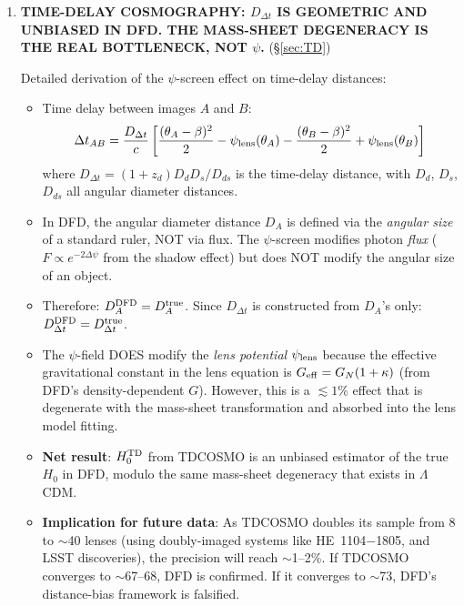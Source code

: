 \documentclass[11pt,a4paper]{article}
\newcommand{\LCDM}{$\Lambda$CDM}
\newcommand{\Dpsi}{\Delta\psi}
\begin{document}
\begin{tcolorbox}[colback=yellow!5!white, colframe=red!70!black,
  title=\textbf{W4i17 TOP 5 FINDINGS --- RANKED BY IMPACT}]
\begin{enumerate}
\item \textbf{TIME-DELAY COSMOGRAPHY: $D_{\Delta t}$ IS GEOMETRIC
  AND UNBIASED IN DFD. THE MASS-SHEET DEGENERACY IS THE REAL
  BOTTLENECK, NOT $\psi$.}
  (\S\ref{sec:TD})

  Detailed derivation of the $\psi$-screen effect on time-delay
  distances:
  \begin{itemize}[nosep]
  \item Time delay between images $A$ and $B$:
    \begin{equation}
    \Delta t_{AB} = \frac{D_{\Delta t}}{c}
    \left[\frac{(\theta_A - \beta)^2}{2} - \psi_{\rm lens}(\theta_A)
    - \frac{(\theta_B - \beta)^2}{2} + \psi_{\rm lens}(\theta_B)\right]
    \end{equation}
    where $D_{\Delta t} = (1+z_d) D_d D_s / D_{ds}$ is the
    time-delay distance, with $D_d$, $D_s$, $D_{ds}$ all
    angular diameter distances.
  \item In DFD, the angular diameter distance $D_A$ is defined
    via the \emph{angular size} of a standard ruler, NOT via
    flux. The $\psi$-screen modifies photon \emph{flux}
    ($F \propto e^{-2\Dpsi}$ from the shadow effect) but does
    NOT modify the angular size of an object.
  \item Therefore: $D_A^{\rm DFD} = D_A^{\rm true}$.
    Since $D_{\Delta t}$ is constructed from $D_A$'s only:
    $D_{\Delta t}^{\rm DFD} = D_{\Delta t}^{\rm true}$.
  \item The $\psi$-field DOES modify the \emph{lens potential}
    $\psi_{\rm lens}$ because the effective gravitational constant
    in the lens equation is $G_{\rm eff} = G_N(1 + \kappa)$
    (from DFD's density-dependent $G$). However, this is
    a $\lesssim 1\%$ effect that is degenerate with the
    mass-sheet transformation and absorbed into the lens
    model fitting.
  \item \textbf{Net result}: $H_0^{\rm TD}$ from TDCOSMO is
    an unbiased estimator of the true $H_0$ in DFD,
    modulo the same mass-sheet degeneracy that exists in
    \LCDM.
  \item \textbf{Implication for future data}: As TDCOSMO
    doubles its sample from 8 to $\sim$40 lenses (using
    doubly-imaged systems like HE~1104$-$1805, and LSST
    discoveries), the precision will reach $\sim$1--2\%.
    If TDCOSMO converges to $\sim$67--68, DFD is confirmed.
    If it converges to $\sim$73, DFD's distance-bias
    framework is falsified.
  \end{itemize}


\end{enumerate}
\end{tcolorbox}
\end{document}

